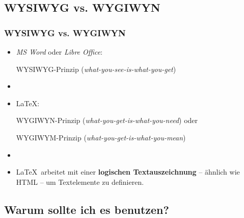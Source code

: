\subsection{WYSIWYG vs. WYGIWYN}

\begin{frame}
\frametitle{WYSIWYG vs. WYGIWYN}

\begin{itemize}
	\item \emph{MS Word} oder \emph{Libre Office}:
	
	\ras WYSIWYG-Prinzip (\emph{what-you-see-is-what-you-get}) 
	
	\item[]
	
	\item \LaTeX :
	
	\ras WYGIWYN-Prinzip (\emph{what-you-get-is-what-you-need}) oder
	
	\ras WYGIWYM-Prinzip (\emph{what-you-get-is-what-you-mean})
	
	\item[]
	
	\item \LaTeX\ arbeitet mit einer \textbf{logischen Textauszeichnung} -- ähnlich wie HTML -- um Textelemente zu definieren.

\end{itemize}\end{frame}


\subsection{Warum sollte ich es benutzen?}
%

